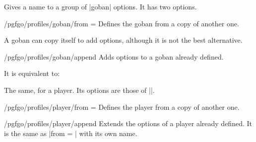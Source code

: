 \begin{command}{\pgfgodefinegoban{}}
	Gives a name to a group of |goban| options. It has two options.

	\begin{key}{/pgfgo/profiles/goban/from = }
		Defines the goban from a copy of another one.
		\begin{codeexample}
		\end{codeexample}

		A goban can copy itself to add options, although it is not the best alternative.
		\begin{codeexample}
		\end{codeexample}
	\end{key}

	\begin{key}{/pgfgo/profiles/goban/append}
		Adds options to a goban already defined.
		\begin{codeexample}
		\end{codeexample}
		It is equivalent to:
		\begin{codeexample}
		\end{codeexample}
	\end{key}
\end{command}

\begin{command}{\pgfgodefineplayer{}}
	The same, for a player. Its options are those of |\pgfgodefinegoban|.

	\begin{key}{/pgfgo/profiles/player/from = }
		Defines the player from a copy of another one.
	\end{key}

	\begin{key}{/pgfgo/profiles/player/append}
		Extends the options of a player already defined. It is the same as |from = | with its own name.
	\end{key}
\end{command}

